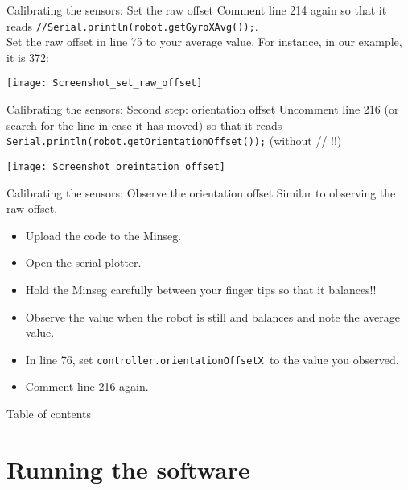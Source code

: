 \begin{frame}{Calibrating the sensors: Set the raw offset}
	Comment line 214 again so that it reads \texttt{//Serial.println(robot.getGyroXAvg());}.\\
	Set the raw offset in line 75 to your average value. For instance, in our example, it is 372:
	\begin{center}
		\texttt{[image: Screenshot\_set\_raw\_offset]}
	\end{center}
\end{frame}

\begin{frame}{Calibrating the sensors: Second step: orientation offset}
	Uncomment line 216 (or search for the line in case it has moved) so that it reads \texttt{Serial.println(robot.getOrientationOffset());} (without // !!)
	\begin{center}
		\texttt{[image: Screenshot\_oreintation\_offset]}
	\end{center}
\end{frame}

\begin{frame}{Calibrating the sensors: Observe the orientation offset}
	Similar to observing the raw offset,
	\begin{itemize}
		\item Upload the code to the Minseg.
		\item Open the serial plotter.
		\item Hold the Minseg carefully between your finger tips so that it balances!!
		\item Observe the value when the robot is still and balances and note the average value.
		\item In line 76, set \texttt{controller.orientationOffsetX }to the value you observed.
		\item Comment line 216 again.
		\end{itemize}
\end{frame}

\begin{frame}{Table of contents}
	\tableofcontents
\end{frame}

\section{Running the software}

